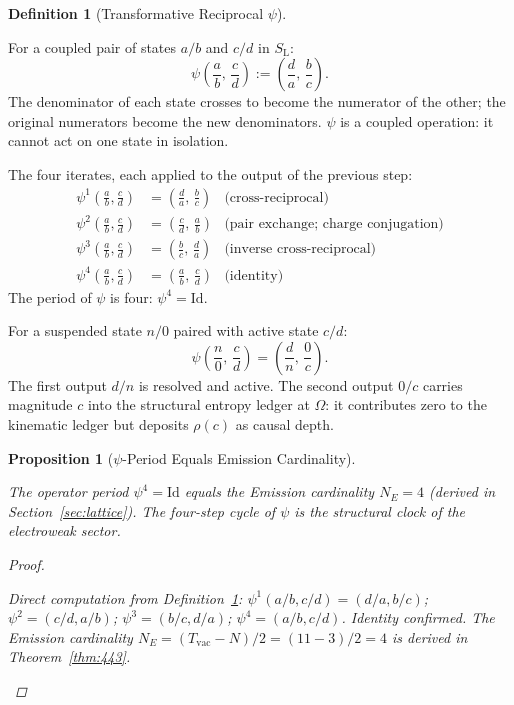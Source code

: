 \documentclass[11pt,letterpaper]{article}
\theoremstyle{plain}
\newtheorem{proposition}[theorem]{Proposition}
\theoremstyle{definition}
\newtheorem{definition}[theorem]{Definition}
\theoremstyle{remark}
\newcommand{\SL}{S_{\mathrm{L}}}
\newcommand{\rank}{\rho}
\newcommand{\Tvac}{T_{\mathrm{vac}}}
\begin{document}
\begin{definition}[Transformative Reciprocal $\psi$]\label{def:psi}
\begin{rsbox}
For a coupled pair of states $a/b$ and $c/d$ in $\SL$:
\[
\psi\!\left(\frac{a}{b},\,\frac{c}{d}\right)
  := \left(\frac{d}{a},\,\frac{b}{c}\right).
\]
The denominator of each state crosses to become the numerator of the
other; the original numerators become the new denominators.  $\psi$ is
a coupled operation: it cannot act on one state in isolation.

The four iterates, each applied to the output of the previous step:
\begin{align*}
\psi^1\!\left(\tfrac{a}{b},\tfrac{c}{d}\right)
  &=\left(\tfrac{d}{a},\,\tfrac{b}{c}\right)
  &\text{(cross-reciprocal)}\\
\psi^2\!\left(\tfrac{a}{b},\tfrac{c}{d}\right)
  &=\left(\tfrac{c}{d},\,\tfrac{a}{b}\right)
  &\text{(pair exchange; charge conjugation)}\\
\psi^3\!\left(\tfrac{a}{b},\tfrac{c}{d}\right)
  &=\left(\tfrac{b}{c},\,\tfrac{d}{a}\right)
  &\text{(inverse cross-reciprocal)}\\
\psi^4\!\left(\tfrac{a}{b},\tfrac{c}{d}\right)
  &=\left(\tfrac{a}{b},\,\tfrac{c}{d}\right)
  &\text{(identity)}
\end{align*}
The period of $\psi$ is four: $\psi^4=\mathrm{Id}$.

For a suspended state $n/0$ paired with active state $c/d$:
\[
\psi\!\left(\frac{n}{0},\,\frac{c}{d}\right)
  =\left(\frac{d}{n},\,\frac{0}{c}\right).
\]
The first output $d/n$ is resolved and active.  The second output
$0/c$ carries magnitude $c$ into the structural entropy ledger at
$\Omega$: it contributes zero to the kinematic ledger but deposits
$\rank(c)$ as causal depth.
\end{rsbox}
\end{definition}

\begin{proposition}[$\psi$-Period Equals Emission
Cardinality]\label{prop:psi-ne}
\begin{rsbox}
The operator period $\psi^4=\mathrm{Id}$ equals the Emission
cardinality $N_E=4$ (derived in Section~\ref{sec:lattice}).  The
four-step cycle of $\psi$ is the structural clock of the
electroweak sector.
\end{rsbox}
\begin{proof}
\begin{rsbox}
Direct computation from Definition~\ref{def:psi}:
$\psi^1(a/b,c/d)=(d/a,b/c)$;
$\psi^2=(c/d,a/b)$;
$\psi^3=(b/c,d/a)$;
$\psi^4=(a/b,c/d)$.  Identity confirmed.
The Emission cardinality $N_E=(\Tvac-N)/2=(11-3)/2=4$ is derived
in Theorem~\ref{thm:443}.
\end{rsbox}
\end{proof}
\end{proposition}
\end{document}
